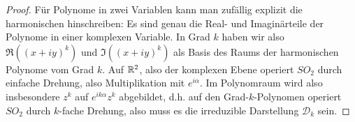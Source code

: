 \begin{proof}
Für Polynome in zwei Variablen kann man zufällig explizit die harmonischen hinschreiben: Es sind genau die Real- und Imaginärteile der Polynome in einer komplexen Variable. In Grad $k$ haben wir also $\Re((x+iy)^k)$ und $\Im((x+iy)^k)$ als Basis des Raums der harmonischen Polynome vom Grad $k$. Auf $\mathbb{R}^2$, also der komplexen Ebene operiert $SO_2$ durch einfache Drehung, also Multiplikation mit $e^{i\alpha}$. Im Polynomraum wird also insbesondere $z^k$ auf $e^{ik\alpha}z^k$ abgebildet, d.h. auf den Grad-$k$-Polynomen operiert $SO_2$ durch $k$-fache Drehung, also muss es die irreduzible Darstellung $\mathcal{D}_k$ sein.
\end{proof}